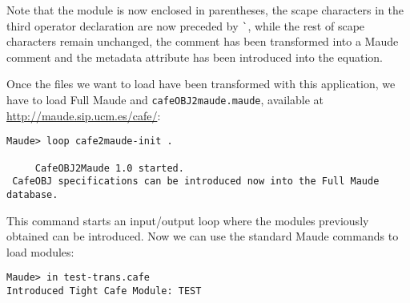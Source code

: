 Note that the module is now enclosed in parentheses, the scape characters in the third
operator declaration are now preceded by \verb"`", while the rest of scape characters
remain unchanged, the comment has been transformed into a Maude comment and the metadata
attribute has been introduced into the equation.

Once the files we want to load have been transformed with this application, we have to load
Full Maude and \verb"cafeOBJ2maude.maude", available at \url{http://maude.sip.ucm.es/cafe/}:

{\codesize
\begin{verbatim}
Maude> loop cafe2maude-init .

     CafeOBJ2Maude 1.0 started.
 CafeOBJ specifications can be introduced now into the Full Maude database.
\end{verbatim}
}

This command starts an input/output loop where the modules previously obtained can be
introduced. Now we can use the standard Maude commands to load modules:

{\codesize
\begin{verbatim}
Maude> in test-trans.cafe
Introduced Tight Cafe Module: TEST
\end{verbatim}
}

